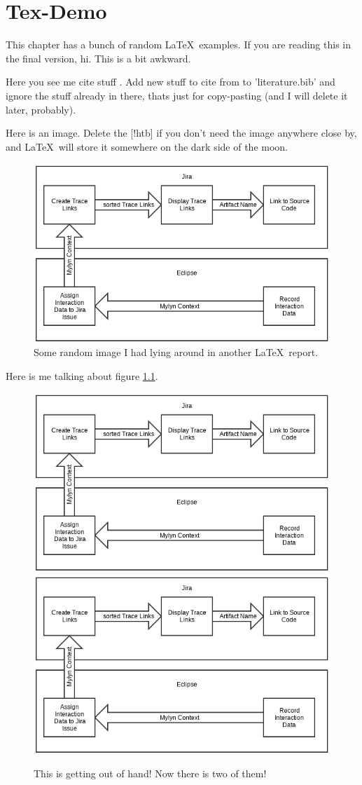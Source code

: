 \chapter{Tex-Demo}

This chapter has a bunch of random \LaTeX\  examples. If you are reading this in the final version, hi. This is a bit awkward.



Here you see me cite stuff \cite{fma_dataset}. Add new stuff to cite from to 'literature.bib' and ignore the stuff already in there, thats just for copy-pasting (and I will delete it later, probably).

Here is an image. Delete the [!htb] if you don't need the image anywhere close by, and \LaTeX\  will store it somewhere on the dark side of the moon.
\begin{figure}[!htb]
	\centering
	\includegraphics[width=.9\linewidth]{images/Approach-Flowchart.png}
	\caption{Some random image I had lying around in another \LaTeX\  report.}
	\label{fig:random_image}
\end{figure}

Here is me talking about figure \ref{fig:random_image}.

\begin{figure}[!htb]
	\centering
	\includegraphics[width=.4\linewidth]{images/Approach-Flowchart.png}
	\quad\includegraphics[width=.4\linewidth]{images/Approach-Flowchart.png}
	\caption{This is getting out of hand! Now there is two of them!}
	\label{fig:lolnooneevenusesthisimage}
\end{figure}


